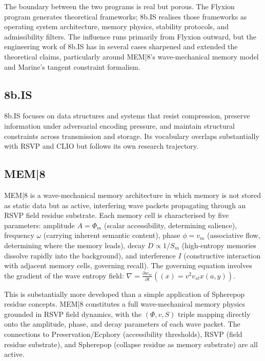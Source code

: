 \documentclass[12pt, twoside]{article}
\begin{document}
The boundary between the two programs is real but porous. The Flyxion program
generates theoretical frameworks; 8b.IS realises those frameworks as
operating system architecture, memory physics, stability protocols, and
admissibility filters. The influence runs primarily from Flyxion outward, but
the engineering work of 8b.IS has in several cases sharpened and extended the
theoretical claims, particularly around MEM|8's wave-mechanical memory model
and Marine's tangent constraint formalism.

\subsection*{8b.IS}

8b.IS focuses on data structures and systems that resist compression, preserve
information under adversarial encoding pressure, and maintain structural
constraints across transmission and storage. Its vocabulary overlaps
substantially with RSVP and CLIO but follows its own research trajectory.

\subsection*{MEM|8}

MEM|8 is a wave-mechanical memory architecture in which memory is not stored
as static data but as active, interfering wave packets propagating through an
RSVP field residue substrate. Each memory cell is characterised by five
parameters: amplitude $A = \Phi_m$ (scalar accessibility, determining
salience), frequency $\omega$ (carrying inherent semantic content), phase
$\phi = v_m$ (associative flow, determining where the memory leads), decay
$D \propto 1/S_m$ (high-entropy memories dissolve rapidly into the
background), and interference $I$ (constructive interaction with adjacent
memory cells, governing recall). The governing equation involves the gradient
of the wave entropy field: $\nabla = \frac{\partial w_{se}}{\partial t}((x)
= v^2 v_{st} x(a,y))$.

This is substantially more developed than a simple application of Spherepop
residue concepts. MEM|8 constitutes a full wave-mechanical memory physics
grounded in RSVP field dynamics, with the $(\Phi, v, S)$ triple mapping
directly onto the amplitude, phase, and decay parameters of each wave packet.
The connections to Preservation/Ecphory (accessibility thresholds), RSVP
(field residue substrate), and Spherepop (collapse residue as memory
substrate) are all active.
\end{document}
